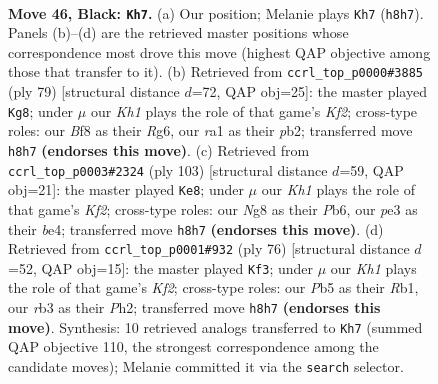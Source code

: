 \documentclass[11pt]{article}
\begin{document}
\clearpage

\begin{figure}[p]\centering
\begin{subfigure}{0.46\textwidth}\centering
\resizebox{\linewidth}{!}{%
\newchessgame
\chessboard[
  setfen={2r2bnk/p5p1/P1b5/1p3p1p/1P3P2/1R2P1P1/8/RNB3K1 b - - 7 46},
  showmover=false,
  pgfstyle=straightmove, color=movearrow, markmove={h8-h7}
]}
\caption{}
\end{subfigure}\hfill
\begin{subfigure}{0.46\textwidth}\centering
\resizebox{\linewidth}{!}{%
\newchessgame
\chessboard[
  setfen={8/1pp2kp1/2pb2r1/8/p7/2PK1N1P/PP3RP1/8 b - - 7 40},
  showmover=false,
  pgfstyle=straightmove, color=movearrow, markmove={f7-g8}
]}
\caption{}
\end{subfigure}
\\[4pt]
\begin{subfigure}{0.46\textwidth}\centering
\resizebox{\linewidth}{!}{%
\newchessgame
\chessboard[
  setfen={3r1b2/5k2/1p2p2p/p3p1p1/4B1P1/P1P1R2P/1P3P2/4K3 b - - 26 52},
  showmover=false,
  pgfstyle=straightmove, color=movearrow, markmove={f7-e8}
]}
\caption{}
\end{subfigure}\hfill
\begin{subfigure}{0.46\textwidth}\centering
\resizebox{\linewidth}{!}{%
\newchessgame
\chessboard[
  setfen={1br5/pp3rk1/6p1/5p1p/PB1P1P2/3BP3/5KPP/1R6 w - - 0 39},
  showmover=false,
  pgfstyle=straightmove, color=movearrow, markmove={f2-f3}
]}
\caption{}
\end{subfigure}
\caption{\textbf{Move 46, Black: \texttt{Kh7}.} (a) Our position; Melanie plays \texttt{Kh7} (\texttt{h8h7}). Panels (b)--(d) are the retrieved master positions whose correspondence most drove this move (highest QAP objective among those that transfer to it). (b) Retrieved from \texttt{ccrl\_top\_p0000\#3885} (ply 79) [structural distance $d$=72, QAP obj=25]: the master played \texttt{Kg8}; under $\mu$ our \emph{Kh1} plays the role of that game's \emph{Kf2}; cross-type roles: our \emph{B}f8 as their \emph{R}g6, our \emph{r}a1 as their \emph{p}b2; transferred move \texttt{h8h7} \textbf{(endorses this move)}. (c) Retrieved from \texttt{ccrl\_top\_p0003\#2324} (ply 103) [structural distance $d$=59, QAP obj=21]: the master played \texttt{Ke8}; under $\mu$ our \emph{Kh1} plays the role of that game's \emph{Kf2}; cross-type roles: our \emph{N}g8 as their \emph{P}b6, our \emph{p}e3 as their \emph{b}e4; transferred move \texttt{h8h7} \textbf{(endorses this move)}. (d) Retrieved from \texttt{ccrl\_top\_p0001\#932} (ply 76) [structural distance $d$=52, QAP obj=15]: the master played \texttt{Kf3}; under $\mu$ our \emph{Kh1} plays the role of that game's \emph{Kf2}; cross-type roles: our \emph{P}b5 as their \emph{R}b1, our \emph{r}b3 as their \emph{P}h2; transferred move \texttt{h8h7} \textbf{(endorses this move)}. Synthesis: 10 retrieved analogs transferred to \texttt{Kh7} (summed QAP objective 110, the strongest correspondence among the candidate moves); Melanie committed it via the \texttt{search} selector.}
\label{fig:thought-m91}
\end{figure}
\end{document}
